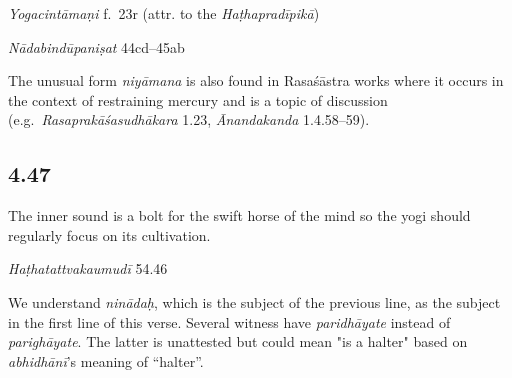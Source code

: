 \begin{ekdosis}

\begin{testimonia}[hp04_046]
\emph{Yogacintāmaṇi} f.~23r (attr. to the \emph{Haṭhapradīpikā})
\begin{versinnote}
\end{versinnote}

\emph{Nādabindūpaniṣat} 44cd–45ab
\begin{versinnote}
\end{versinnote}
\end{testimonia}

\begin{philcomm}[hp04_046]
The unusual form \emph{niyāmana} is also found in Rasaśāstra works where it occurs in the context of restraining mercury and is a topic of discussion (e.g.~\emph{Rasaprakāśasudhākara} 1.23, \emph{Ānandakanda} 1.4.58–59).
\end{philcomm}


\subsection*{4.47}
\begin{translation}[hp04_047]
The inner sound is a bolt for the swift horse of the mind so the yogi should regularly focus on its cultivation.
\end{translation} 


\begin{testimonia}[hp04_047]
\emph{Haṭhatattvakaumudī} 54.46
\begin{versinnote}
\end{versinnote}
\end{testimonia}

\begin{philcomm}[hp04_047]
We understand \textit{ninādaḥ}, which is the subject of the previous line, as the subject in the first line of this verse. Several witness have \emph{paridhāyate} instead of \emph{parighāyate}. The latter is unattested but could mean "is a halter" based on \emph{abhidhānī}’s meaning of “halter”.
\end{philcomm}


\end{ekdosis}
